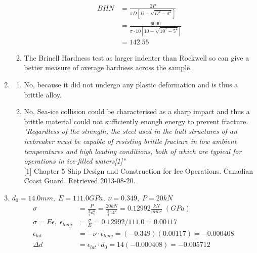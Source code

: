 \documentclass[11pt]{article}
\begin{document}
\begin{enumerate}
\begin{enumerate}
\begin{align*}
                              BHN & = \frac{2P}{\pi D \left[D-\sqrt{D^2-d^2}\right]}           \\
                                  & = \frac{6000}{\pi{\cdot}10\left[10-\sqrt{10^2-5^2}\right]} \\
                                  & = 142.55
                        \end{align*}
                  \item The Brinell Hardness test as larger indenter than Rockwell so can give a better measure of average hardness across the sample.
            \end{enumerate}
      \item
            \begin{enumerate}
                  \item No, because it did not undergo any plastic deformation and is thus a brittle alloy.
                  \item No, Sea-ice collision could be characterised as a sharp impact and thus a brittle material could not sufficiently enough energy to prevent fracture. \\
                        \textit{\small "Regardless of the strength, the steel used in the hull structures of an icebreaker must be capable of resisting brittle fracture in low ambient temperatures and high loading conditions, both of which are typical for operations in ice-filled waters[1]"}\\
                        {\tiny [1] Chapter 5 Ship Design and Construction for Ice Operations. Canadian Coast Guard. Retrieved 2013-08-20.}
            \end{enumerate}
      \item $d_0=14.0mm, \; E = 111.0GPa, \; \nu = 0.349, \; P=20kN$
            \begin{align*}
                  \sigma                                 & = \frac{P}{\frac{\pi}{4}d_0^2} = \frac{20kN}{\frac{\pi}{4}14^2} = 0.12992 \frac{kN}{mm^2} \; (GPa) \\
                  \sigma = E\epsilon, \; \epsilon_{long} & = \frac{\sigma}{E} = 0.12992/111.0=0.00117                                                         \\
                  \epsilon_{lat}                         & = -\nu{\cdot}\epsilon_{long} = (-0.349)(0.00117)=-0.000408                                         \\
                  \Delta d                               & = \epsilon_{lat}{\cdot}d_0 = 14(-0.000408)=-0.005712                                               \\

\end{align*}
\end{enumerate}
\end{document}
